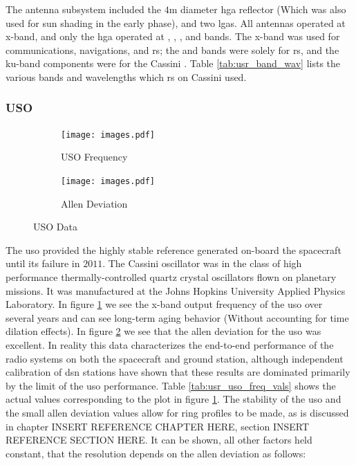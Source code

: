 \documentclass{article}
\theoremstyle{mystyle}
\begin{document}
The antenna subsystem included the $4$m diameter \gls{hga} reflector (Which was also used for sun shading in the early  phase), and two \glspl{lga}. All antennas operated at \gls{x-band}, and only the \gls{hga} operated at , , , and  bands. The \gls{x-band} was used for communications, navigations, and \gls{rs}; the  and  bands were solely for \gls{rs}, and the \gls{ku-band} components were for the Cassini . Table \ref{tab:usr_band_wav} lists the various bands and wavelengths which \gls{rs} on Cassini used.

\subsubsection{\footnotesize USO \label{subsubsec:usr_USO}}

\begin{figure}[H]
	\centering
	\vspace{-1ex}
	\begin{subfigure}[b]{0.45\textwidth}
	    \texttt{[image: images.pdf]}
	    \caption{USO Frequency}
	    \label{fig:usr_uso_freq_plot_1}
    \end{subfigure}
    \begin{subfigure}[b]{0.49\textwidth}
        \texttt{[image: images.pdf]}
        \caption{\scriptsize Allen Deviation}
        \label{fig:usr_uso_allen_plot_1}
    \end{subfigure}
        \caption{USO Data}
        \label{fig:usr_uso_freq_allen_dev}
\end{figure}

The \gls{uso} provided the highly stable reference generated on-board the spacecraft until its failure in $2011$. The Cassini oscillator was in the class of high performance thermally-controlled quartz crystal oscillators flown on planetary missions. It was manufactured at the Johns Hopkins University Applied Physics Laboratory. In figure \ref{fig:usr_uso_freq_plot_1} we see the \gls{x-band} output frequency of the \gls{uso} over several years and can see long-term aging behavior (Without accounting for time dilation effects). In figure \ref{fig:usr_uso_allen_plot_1} we see that the \gls{allen deviation} for the \gls{uso} was excellent. In reality this data characterizes the end-to-end performance of the radio systems on both the spacecraft and ground station, although independent calibration of \gls{dsn} stations have shown that these results are dominated primarily by the limit of the \gls{uso} performance. Table \ref{tab:usr_uso_freq_vals} shows the actual values corresponding to the plot in figure \ref{fig:usr_uso_freq_plot_1}. The stability of the \gls{uso} and the small \gls{allen deviation} values allow for  ring profiles to be made, as is discussed in chapter INSERT REFERENCE CHAPTER HERE, section INSERT REFERENCE SECTION HERE. It can be shown, all other factors held constant, that the resolution depends on the \gls{allen deviation} as follows:
\end{document}
